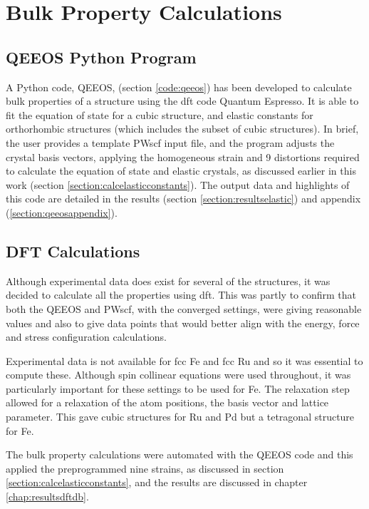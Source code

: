 \section{Bulk Property Calculations}

\subsection{QEEOS Python Program}
\label{section:qeeospyprog}

A Python code, QEEOS, (section \ref{code:qeeos}) has been developed to calculate bulk properties of a structure using the \acrshort{dft} code Quantum Espresso.  It is able to fit the equation of state for a cubic structure, and elastic constants for orthorhombic structures (which includes the subset of cubic structures).  In brief, the user provides a template PWscf input file, and the program adjusts the crystal basis vectors, applying the homogeneous strain and 9 distortions required to calculate the equation of state and elastic crystals, as discussed earlier in this work (section \ref{section:calcelasticconstants}).  The output data and highlights of this code are detailed in the results (section \ref{section:resultselastic}) and appendix (\ref{section:qeeosappendix}).


\subsection{DFT Calculations}

Although experimental data does exist for several of the structures, it was decided to calculate all the properties using \acrshort{dft}.  This was partly to confirm that both the QEEOS and PWscf, with the converged settings, were giving reasonable values and also to give data points that would better align with the energy, force and stress configuration calculations.

Experimental data is not available for \acrshort{fcc} Fe and \acrshort{fcc} Ru and so it was essential to compute these.  Although spin collinear equations were used throughout, it was particularly important for these settings to be used for Fe.  The relaxation step allowed for a relaxation of the atom positions, the basis vector and lattice parameter.  This gave cubic structures for Ru and Pd but a tetragonal structure for Fe.

The bulk property calculations were automated with the QEEOS code and this applied the preprogrammed nine strains, as discussed in section \ref{section:calcelasticconstants}, and the results are discussed in chapter \ref{chap:resultsdftdb}. 



